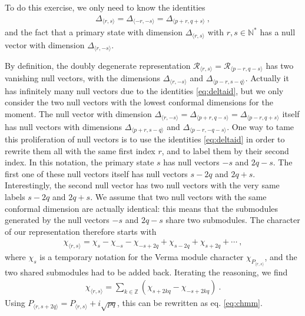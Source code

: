 \documentclass[12pt, a4paper]{article}
\theoremstyle{break}
\begin{document}
To do this exercise, we only need to know the identities 
\begin{align}
 \Delta_{\langle r,s\rangle} = \Delta_{\langle -r,-s\rangle}=\Delta_{\langle p+r,q+s\rangle}\ ,
 \label{eq:deltaid}
\end{align}
and the fact that a primary state with dimension $\Delta_{\langle r,s\rangle}$ with $r,s\in\mathbb{N}^*$ has a null vector with dimension $\Delta_{\langle r,-s\rangle}$.

By definition, the doubly degenerate representation $\mathcal{R}_{\langle r,s\rangle} =\mathcal{R}_{\langle p-r,q-s\rangle}$ has two vanishing null vectors, with the dimensions $\Delta_{\langle r, -s\rangle}$ and $\Delta_{\langle p-r,s-q\rangle}$. Actually it has infinitely many null vectors due to the identities \eqref{eq:deltaid}, but we only consider the two null vectors with the lowest conformal dimensions for the moment. 
The null vector with dimension $\Delta_{\langle r, -s\rangle}=\Delta_{\langle p+r, q-s\rangle} = \Delta_{\langle p-r,q+s\rangle}$ itself has null vectors with dimensions $\Delta_{\langle p+r, s-q\rangle}$ and $\Delta_{\langle p-r,-q-s\rangle}$. One way to tame this proliferation of null vectors is to use the identities \eqref{eq:deltaid} in order to rewrite them all with the same first index $r$, and to label them by their second index. In this notation, the primary state $s$ has null vectors $-s$ and $2q-s$. The first one of these null vectors itself has null vectors $s-2q$ and $2q+s$. Interestingly, the second null vector has two null vectors with the very same labels $s-2q$ and $2q+s$. We assume that two null vectors with the same conformal dimension are actually identical: this means that the submodules generated by the null vectors $-s$ and $2q-s$ share two submodules. The character of our representation therefore starts with 
\begin{align}
 \chi_{\langle r,s\rangle} = \chi_s - \chi_{-s} -\chi_{-s+2q} + \chi_{s-2q} + \chi_{s+2q} + \cdots \ , 
\end{align}
where $\chi_s$ is a temporary notation for the Verma module character $\chi_{P_{\langle r,s\rangle}}$, and the two shared submodules had to be added back. Iterating the reasoning, we find 
\begin{align}
 \chi_{\langle r,s\rangle} = \sum_{k\in\mathbb{Z}} \left(\chi_{s + 2k q} -\chi_{-s+2k q}\right)\ . 
\end{align}
Using $P_{\langle r,s+2q\rangle} = P_{\langle r,s\rangle} + i\sqrt{pq}$, this can be rewritten as eq. \eqref{eq:chmm}.
\end{document}
